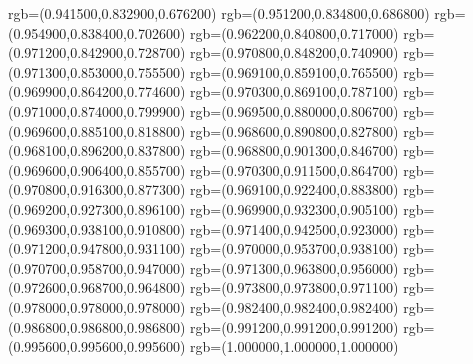{{		rgb=(0.941500,0.832900,0.676200)
		rgb=(0.951200,0.834800,0.686800)
		rgb=(0.954900,0.838400,0.702600)
		rgb=(0.962200,0.840800,0.717000)
		rgb=(0.971200,0.842900,0.728700)
		rgb=(0.970800,0.848200,0.740900)
		rgb=(0.971300,0.853000,0.755500)
		rgb=(0.969100,0.859100,0.765500)
		rgb=(0.969900,0.864200,0.774600)
		rgb=(0.970300,0.869100,0.787100)
		rgb=(0.971000,0.874000,0.799900)
		rgb=(0.969500,0.880000,0.806700)
		rgb=(0.969600,0.885100,0.818800)
		rgb=(0.968600,0.890800,0.827800)
		rgb=(0.968100,0.896200,0.837800)
		rgb=(0.968800,0.901300,0.846700)
		rgb=(0.969600,0.906400,0.855700)
		rgb=(0.970300,0.911500,0.864700)
		rgb=(0.970800,0.916300,0.877300)
		rgb=(0.969100,0.922400,0.883800)
		rgb=(0.969200,0.927300,0.896100)
		rgb=(0.969900,0.932300,0.905100)
		rgb=(0.969300,0.938100,0.910800)
		rgb=(0.971400,0.942500,0.923000)
		rgb=(0.971200,0.947800,0.931100)
		rgb=(0.970000,0.953700,0.938100)
		rgb=(0.970700,0.958700,0.947000)
		rgb=(0.971300,0.963800,0.956000)
		rgb=(0.972600,0.968700,0.964800)
		rgb=(0.973800,0.973800,0.971100)
		rgb=(0.978000,0.978000,0.978000)
		rgb=(0.982400,0.982400,0.982400)
		rgb=(0.986800,0.986800,0.986800)
		rgb=(0.991200,0.991200,0.991200)
		rgb=(0.995600,0.995600,0.995600)
		rgb=(1.000000,1.000000,1.000000)
	}
}